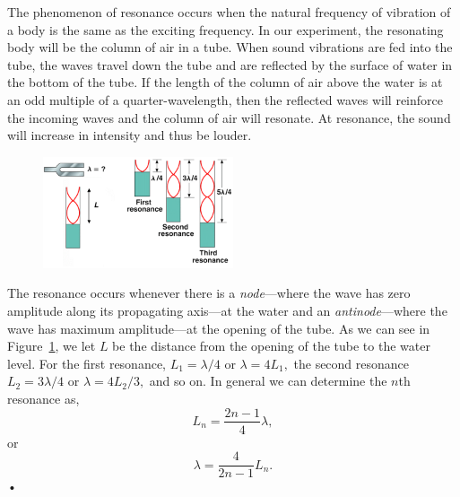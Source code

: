 \documentclass[main.tex]{subfiles}
\begin{document}
The phenomenon of resonance occurs when the natural frequency of vibration of a body is the same as the exciting frequency. In our experiment, the resonating body will be the column of air in a tube. When sound vibrations are fed into the tube, the waves travel down the tube and are reflected by the surface of water in the bottom of the tube. If the length of the column of air above the water is at an odd multiple of a quarter-wavelength, then the reflected waves will reinforce the incoming waves and the column of air will resonate. At resonance, the sound will increase in intensity and thus be louder.

\begin{figure}
\centering
\includegraphics[width=0.5\textwidth]{Sound_Resonance}
\caption{} \label{fig:Resonance}
\end{figure}
The resonance occurs whenever there is a \emph{node}---where the wave has zero amplitude along its propagating axis---at the water and an \emph{antinode}---where the wave has maximum amplitude---at the opening of the tube. As we can see in Figure~\ref{fig:Resonance}, we let $L$ be the distance from the opening of the tube to the water level. For the first resonance, $L_1=\lambda/4$ or $\lambda=4L_1,$ the second resonance $L_2=3\lambda/4$ or $\lambda=4L_2/3,$ and so on. In general we can determine the $n$th resonance as,
\begin{equation} \label{eq:Resonance}
L_n=\frac{2n-1}{4}\lambda,
\end{equation}
or
\begin{equation} \label{eq:Wavelength}
\lambda=\frac{4}{2n-1}L_n.
\end{equation}•
\end{document}
